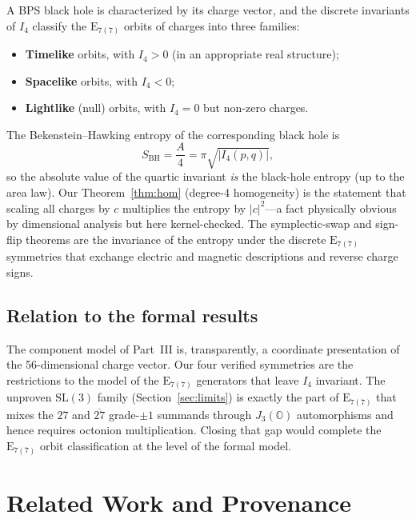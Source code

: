 \documentclass[11pt]{article}
\theoremstyle{definition}
\newcommand{\OO}{\mathbb{O}}
\newcommand{\Jthree}{J_3(\OO)}
\newcommand{\Iq}{I_4}
\newcommand{\Esevenc}{\mathrm{E}_{7(7)}}
\begin{document}
A BPS black hole is characterized by its charge vector, and the discrete
invariants of $\Iq$ classify the $\Esevenc$ orbits of charges into three
families:
\begin{itemize}[leftmargin=2em]
\item \textbf{Timelike} orbits, with $\Iq>0$ (in an appropriate real structure);
\item \textbf{Spacelike} orbits, with $\Iq<0$;
\item \textbf{Lightlike} (null) orbits, with $\Iq=0$ but non-zero charges.
\end{itemize}
The Bekenstein--Hawking entropy of the corresponding black hole is
\[
S_{\mathrm{BH}} = \frac{A}{4} = \pi\sqrt{|\Iq(p,q)|},
\]
so the absolute value of the quartic invariant \emph{is} the black-hole entropy
(up to the area law). Our Theorem~\ref{thm:hom} (degree-4 homogeneity) is the
statement that scaling all charges by $c$ multiplies the entropy by
$|c|^2$---a fact physically obvious by dimensional analysis but here
kernel-checked. The symplectic-swap and sign-flip theorems are the invariance
of the entropy under the discrete $\Esevenc$ symmetries that exchange electric
and magnetic descriptions and reverse charge signs.

\subsection{Relation to the formal results}
\label{sec:udu-rel}

The component model of Part~III is, transparently, a coordinate presentation of
the 56-dimensional charge vector. Our four verified symmetries are the
restrictions to the model of the $\Esevenc$ generators that leave $\Iq$
invariant. The unproven $\mathrm{SL}(3)$ family
(Section~\ref{sec:limits}) is exactly the part of $\Esevenc$ that mixes the
$27$ and $\overline{27}$ grade-$\pm1$ summands through $\Jthree$ automorphisms
and hence requires octonion multiplication. Closing that gap would complete the
$\Esevenc$ orbit classification at the level of the formal model.

\section{Related Work and Provenance}
\label{sec:provenance}
\end{document}

